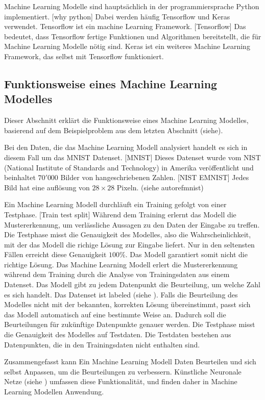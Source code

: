 Machine Learning Modelle sind hauptsächlich in der programmiersprache Python
implementiert. [why python] Dabei werden häufig Tensorflow und Keras verwendet.
Tensorflow ist ein machine Learning Framework. [Tensorflow] Das bedeutet, dass
Tensorflow fertige Funktionen und Algorithmen bereitstellt, die für Machine
Learning Modelle nötig sind. Keras ist ein weiteres Machine Learning Framework,
das selbst mit Tensorflow funktioniert.


\subsection{Funktionsweise eines Machine Learning Modelles}
\label{sub:t_ml_func}
Dieser Abschnitt erklärt die Funktionsweise eines Machine Learning Modelles,
basierend auf dem Beispielproblem aus dem letzten Abschnitt (siehe). 

Bei den Daten, die das Machine Learning Modell analysiert handelt es sich in
diesem Fall um das MNIST Datenset. [MNIST]  Dieses Datenset wurde vom NIST
(National Institute of Standards and Technology) in Amerika veröffentlicht und
beinhaltet $70'000$ Bilder von hangeschriebenen Zahlen. [NIST EMNIST] Jedes Bild
hat eine auflösung von $28\times28$ Pixeln. (siehe autoref{mnist})

                
Ein Machine Learning Modell durchläuft ein Training gefolgt von einer Testphase.
[Train test split] Während dem Training erlernt das Modell die Mustererkennung,
um verlässliche Aussagen zu den Daten der Eingabe zu treffen. Die Testphase
misst die Genauigkeit des Modelles, also die Wahrscheinlichkeit, mit der das
Modell die richige Lösung zur Eingabe liefert. Nur in den seltensten Fällen
erreicht diese Genauigkeit $100\%$. Das Modell garantiert somit nicht die
richtige Lösung. Das Machine Learning Modell erlert die Mustererkennung während
dem Training durch die Analyse von Trainingsdaten aus einem Datenset. Das Modell
gibt zu jedem Datenpunkt die Beurteilung, um welche Zahl es sich handelt. Das
Datenset ist labeled (siehe ). Falls die Beurteilung des
Modelles nicht mit der bekannten, korrekten Lösung übereinstimmt, passt sich das
Modell automatisch auf eine bestimmte Weise an. Dadurch soll die Beurteilungen
für zukünftige Datenpunkte genauer werden. Die Testphase misst die Genauigkeit
des Modelles auf Testdaten. Die Testdaten bestehen aus Datenpunkten, die in den
Trainingsdaten nicht enthalten sind.

Zusammengefasst kann Ein Machine Learning Modell Daten Beurteilen und sich
selbst Anpassen, um die Beurteilungen zu verbessern. Künstliche Neuronale Netze
(siehe ) umfassen diese Funktionalität, und finden daher in
Machine Learning Modellen Anwendung.


